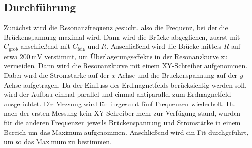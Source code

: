 \subsection{Durchführung}
Zunächst wird die Resonanzfrequenz gesucht, also die Frequenz, bei der die Brückenspannung maximal wird. Dann wird die Brücke abgeglichen, zuerst mit $C_\mathrm{grob}$ anschließend mit $C_\mathrm{fein}$ und $R$. Anschließend wird die Brücke mittels $R$ auf etwa $\SI{200}{\milli\volt}$ verstimmt, um Überlagerungseffekte in der Resonanzkurve zu vermeiden. Dann wird die Resonanzkurve mit einem XY-Schreiber aufgenommen. Dabei wird die Stromstärke auf der $x$-Achse und die Brückenspannung auf der $y$-Achse aufgetragen. Da der Einfluss des Erdmagnetfelds berücksichtig werden soll, wird der Aufbau einmal parallel und einmal antiparallel zum Erdmagnetfeld ausgerichtet. Die Messung wird für insgesamt fünf Frequenzen wiederholt. Da nach der ersten Messung kein XY-Schreiber mehr zur Verfügung stand, wurden für die anderen Frequenzen jeweils Brückenspannung und Stromstärke in einem Bereich um das Maximum aufgenommen. Anschließend wird ein Fit durchgeführt, um so das Maximum zu bestimmen.
